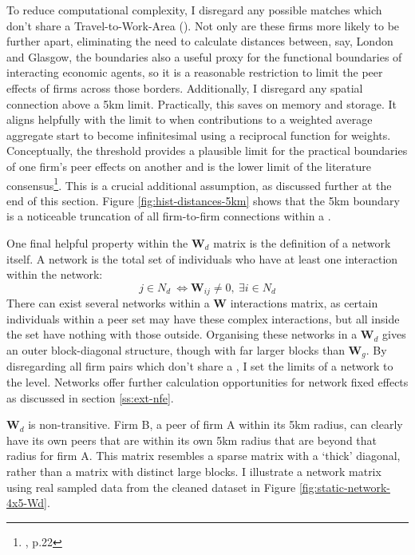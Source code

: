 To reduce computational complexity,
I disregard any possible matches which don't share a Travel-to-Work-Area ().
Not only are these firms more likely to be further apart,
eliminating the need to calculate distances between, say,
London and Glasgow,
the  boundaries also a useful proxy for the functional boundaries
of interacting economic agents, so it is a reasonable
restriction to limit the peer effects of firms across those borders.
Additionally, I disregard any spatial connection above a 5km limit.
Practically, this saves on memory and storage.
It aligns helpfully with the limit to when contributions to a weighted average aggregate
start to become infinitesimal using a reciprocal function for weights.
Conceptually, the threshold provides a plausible limit
for the practical boundaries of one firm's peer effects on another
and is the lower limit of the literature consensus\footnote{\cite{Graham2018}, p.22}.
This is a crucial additional assumption, as discussed further at the end of this section.
Figure \ref{fig:hist-distances-5km}
shows that the 5km boundary is a noticeable truncation of all firm-to-firm
connections within a .
\par
One final helpful property within the $\mathbf W_d$ matrix
is the definition of a network itself.
A network is the total set of individuals who have at least one interaction
within the network:
\begin{equation*}
    j \in N_d\ \iff \mathbf W_{ij}\neq 0,\ \exists i \in N_d
\end{equation*}
There can exist several networks within a $\mathbf W$ interactions matrix,
as certain individuals within a peer set may have these complex interactions,
but all inside the set have nothing with those outside.
Organising these networks in a $\mathbf W_d$ gives an outer block-diagonal structure,
though with far larger blocks than $\mathbf W_g$.
By disregarding all firm pairs which don't share a ,
I set the limits of a network to the  level.
Networks offer further calculation opportunities for network fixed effects
as discussed in section \ref{ss:ext-nfe}.
\par
$\mathbf W_d$ is non-transitive.
Firm B, a peer of firm A within its 5km radius, can clearly have its own peers
that are within its own 5km radius that are beyond that radius for firm A.
This matrix resembles a sparse matrix with a `thick' diagonal,
rather than a matrix with distinct large blocks.
I illustrate a network matrix using real sampled data
from the cleaned dataset in Figure \ref{fig:static-network-4x5-Wd}.
